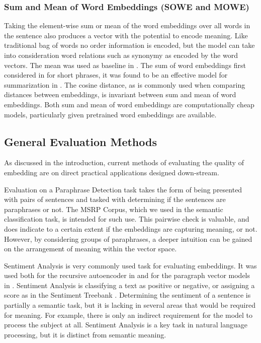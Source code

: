 \documentclass[]{book}
\begin{document}
\subsubsection{Sum and Mean of Word Embeddings (SOWE and MOWE)}

Taking the element-wise sum or mean of the word embeddings over all
words in the sentence also produces a vector with the potential to
encode meaning. Like traditional bag of words no order information
is encoded, but the model can take into consideration word relations
such as synonymy as encoded by the word vectors. The mean was used
as baseline in \cite{le2014distributed}. The sum of word embeddings
first considered in \cite{mikolovSkip} for short phrases, it was
found to be an effective model for summarization in \cite{KaagebExtractiveSummaristation}.
The cosine distance, as is commonly used when comparing distances
between embeddings, is invariant between sum and mean of word embeddings.
Both sum and mean of word embeddings are computationally cheap models,
particularly given pretrained word embeddings are available.


\subsection{General Evaluation Methods}

As discussed in the introduction, current methods of evaluating the
quality of embedding are on direct practical applications designed
down-stream.

Evaluation on a Paraphrase Detection task takes the form of being
presented with pairs of sentences and tasked with determining if the
sentences are paraphrases or not. The MSRP Corpus, \cite{msrParapharaCorpus}
which we used in the semantic classification task, is intended for
such use. This pairwise check is valuable, and does indicate to a
certain extent if the embeddings are capturing meaning, or not. However,
by considering groups of paraphrases, a deeper intuition can be gained
on the arrangement of meaning within the vector space.

Sentiment Analysis is very commonly used task for evaluating embeddings.
It was used both for the recursive autoencoder in \cite{SocherEtAl2011:RAE}
and for the paragraph vector models in \cite{le2014distributed}.
Sentiment Analysis is classifying a text as positive or negative,
or assigning a score as in the Sentiment Treebank \cite{RvNTN}. Determining
the sentiment of a sentence is partially a semantic task, but it is
lacking in several areas that would be required for meaning. For example,
there is only an indirect requirement for the model to process the
subject at all. Sentiment Analysis is a key task in natural language
processing, but it is distinct from semantic meaning.
\end{document}
